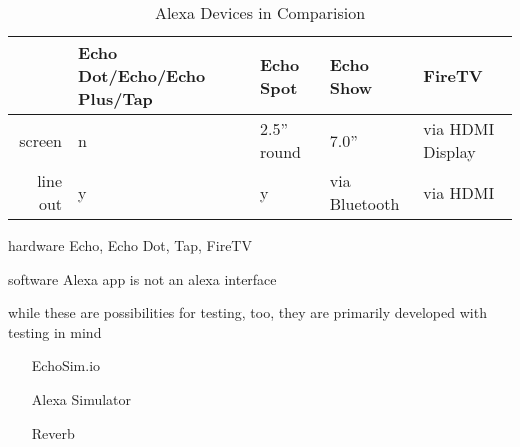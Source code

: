 \begin{table}[htbp]
	\caption{Alexa Devices in Comparision}\label{alexaDeviceTable}
	\centering
	\begin{tabularx}{\textwidth}{ r | l l l l }
		
				& Echo Dot/Echo/Echo Plus/Tap & Echo Spot     & Echo Show     & FireTV \\ \hline
		screen  & n                           & 2.5'' round 		  & 7.0'' 		  & via HDMI Display       \\
		line out& y      					  & y             & via Bluetooth & via HDMI      \\
	\end{tabularx}
\end{table}


hardware 
Echo, Echo Dot, Tap, FireTV

software
Alexa app is not an alexa interface

while these are possibilities for testing, too,  they are primarily developed with testing in mind
\begin{itemize}
	\item[EchoSim.io]
	\item[Alexa Simulator]
	\item[Reverb]
\end{itemize}








